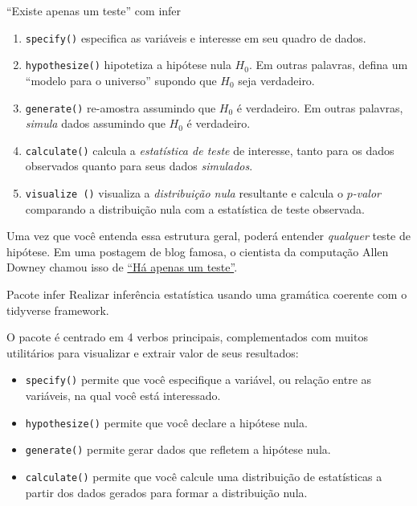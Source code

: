 \documentclass[
  9pt,
  ignorenonframetext,
  aspectratio=169]{beamer}
\providecommand{\tightlist}{%
  \setlength{\itemsep}{0pt}\setlength{\parskip}{0pt}}
\begin{document}
\begin{frame}[fragile]{``Existe apenas um teste'' com infer}
\protect\hypertarget{existe-apenas-um-teste-com-infer}{}
\begin{enumerate}
\tightlist
\item
  \texttt{specify()} especifica as variáveis e interesse em seu quadro
  de dados.
\item
  \texttt{hypothesize()} hipotetiza a hipótese nula \(H_0\). Em outras
  palavras, defina um ``modelo para o universo'' supondo que \(H_0\)
  seja verdadeiro.
\item
  \texttt{generate()} re-amostra assumindo que \(H_0\) é verdadeiro. Em
  outras palavras, \emph{simula} dados assumindo que \(H_0\) é
  verdadeiro.
\item
  \texttt{calculate()} calcula a \emph{estatística de teste} de
  interesse, tanto para os dados observados quanto para seus dados
  \emph{simulados}.
\item
  \texttt{visualize\ ()} visualiza a \emph{distribuição nula} resultante
  e calcula o \emph{\(p\)-valor} comparando a distribuição nula com a
  estatística de teste observada.
\end{enumerate}

Uma vez que você entenda essa estrutura geral, poderá entender
\emph{qualquer} teste de hipótese. Em uma postagem de blog famosa, o
cientista da computação Allen Downey chamou isso de
\href{http://allendowney.blogspot.com/2016/06/there-is-still-only-one-test.html}{``Há
apenas um teste''}.
\end{frame}

\begin{frame}[fragile]{Pacote infer}
\protect\hypertarget{pacote-infer}{}
Realizar inferência estatística usando uma gramática coerente com o
tidyverse framework.

O pacote é centrado em 4 verbos principais, complementados com muitos
utilitários para visualizar e extrair valor de seus resultados:

\begin{itemize}
\tightlist
\item
  \texttt{specify()} permite que você especifique a variável, ou relação
  entre as variáveis, na qual você está interessado.
\item
  \texttt{hypothesize()} permite que você declare a hipótese nula.
\item
  \texttt{generate()} permite gerar dados que refletem a hipótese nula.
\item
  \texttt{calculate()} permite que você calcule uma distribuição de
  estatísticas a partir dos dados gerados para formar a distribuição
  nula.
\end{itemize}
\end{frame}
\end{document}
